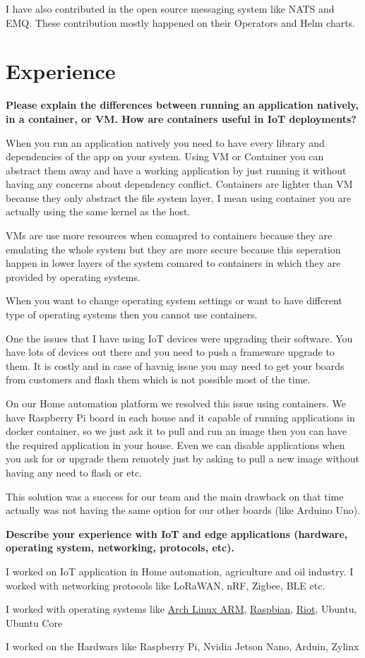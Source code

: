 I have also contributed in the open source messaging system like NATS and EMQ. These contribution mostly happened
on their Operators and Helm charts.

\section{Experience}

\textbf{Please explain the differences between running an application natively, in a container, or VM.
How are containers useful in IoT deployments?}

When you run an application natively you need to have every library and dependencies of the app on your system.
Using VM or Container you can abstract them away and have a working application by just running it without
having any concerns about dependency conflict.
Containers are lighter than VM because they only abstract the file system layer, I mean using container
you are actually using the same kernel as the host.

VMs are use more resources when comapred to containers because they are emulating the whole system but they are
more secure because this seperation happen in lower layers of the system comared to containers in which they
are provided by operating systems.

When you want to change operating system settings or want to have different type of operating systems then you cannot
use containers.

One the issues that I have using IoT devices were upgrading their software. You have lots of devices out there
and you need to push a frameware upgrade to them. It is costly and in case of havnig issue you may need to get
your boards from customers and flash them which is not possible most of the time.

On our Home automation platform we resolved this issue using containers. We have Raspberry Pi board in each house
and it capable of running applications in docker container, so we just ask it to pull and run an image then
you can have the required application in your house. Even we can disable applications when you ask for or upgrade
them remotely just by asking to pull a new image without having any need to flash or etc.

This solution was a success for our team and the main drawback on that time actually was not having the same
option for our other boards (like Arduino Uno).

\textbf{Describe your experience with IoT and edge applications (hardware, operating system, networking, protocols, etc).}

I worked on IoT application in Home automation, agriculture and oil industry. I worked with networking protocols
like LoRaWAN, nRF, Zigbee, BLE etc.

I worked with operating systems like \href{https://archlinuxarm.org/}{Arch Linux ARM}, \href{https://www.raspbian.org/}{Raspbian},
\href{https://www.riot-os.org/}{Riot}, Ubuntu, Ubuntu Core

I worked on the Hardwars like Raspberry Pi, Nvidia Jetson Nano, Arduin, Zylinx

